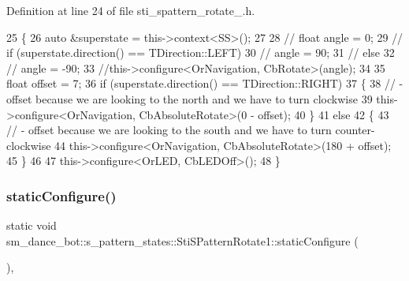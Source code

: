 Definition at line 24 of file sti\+\_\+spattern\+\_\+rotate\+\_.\+h.


\begin{DoxyCode}
25     \{
26         \textcolor{keyword}{auto} &superstate = this->context<SS>();
27 
28         \textcolor{comment}{// float angle = 0;}
29         \textcolor{comment}{// if (superstate.direction() == TDirection::LEFT)}
30         \textcolor{comment}{//     angle = 90;}
31         \textcolor{comment}{// else}
32         \textcolor{comment}{//     angle = -90;}
33         \textcolor{comment}{//this->configure<OrNavigation, CbRotate>(angle);}
34 
35         \textcolor{keywordtype}{float} offset = 7;
36         \textcolor{keywordflow}{if} (superstate.direction() == TDirection::RIGHT)
37         \{
38             \textcolor{comment}{// - offset because we are looking to the north and we have to turn clockwise}
39             this->configure<OrNavigation, CbAbsoluteRotate>(0 - offset);
40         \}
41         \textcolor{keywordflow}{else}
42         \{
43             \textcolor{comment}{// - offset because we are looking to the south and we have to turn counter-clockwise}
44             this->configure<OrNavigation, CbAbsoluteRotate>(180 + offset);
45         \}
46 
47         this->configure<OrLED, CbLEDOff>();
48     \}
\end{DoxyCode}
\mbox{\label{structsm__dance__bot_1_1s__pattern__states_1_1StiSPatternRotate1_a22e28b6bd56041b42472185c5fd74ff7}} 
\subsubsection{\texorpdfstring{static\+Configure()}{staticConfigure()}}
{\footnotesize\ttfamily static void sm\+\_\+dance\+\_\+bot\+::s\+\_\+pattern\+\_\+states\+::\+Sti\+S\+Pattern\+Rotate1\+::static\+Configure (\begin{DoxyParamCaption}{ }\end{DoxyParamCaption})\hspace{0.3cm}{\ttfamily [inline]}, {\ttfamily [static]}}



